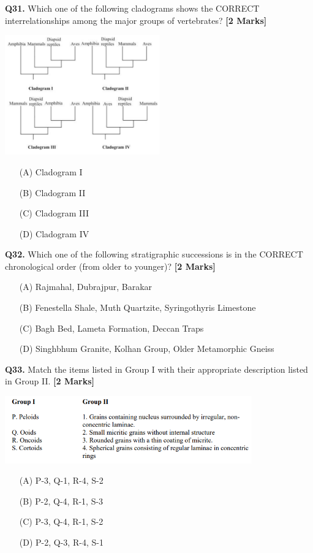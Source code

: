 \documentclass[11pt]{article}
\newcommand{\questionb}[2]{
    \noindent\textbf{Q#2.} #1 \hfill \textbf{[2 Marks]}
}
\begin{document}
\questionb{Which one of the following cladograms shows the CORRECT interrelationships among the major groups of vertebrates?}{31}
\begin{center}
\includegraphics[width=0.5\textwidth]{figures/31}
\end{center}
\begin{enumerate}
    \item[(A)] Cladogram I
    \item[(B)] Cladogram II
    \item[(C)] Cladogram III
    \item[(D)] Cladogram IV
\end{enumerate}
\vspace{0.5cm}

\questionb{Which one of the following stratigraphic successions is in the CORRECT chronological order (from older to younger)?}{32}
\begin{enumerate}
    \item[(A)] Rajmahal, Dubrajpur, Barakar
    \item[(B)] Fenestella Shale, Muth Quartzite, Syringothyris Limestone
    \item[(C)] Bagh Bed, Lameta Formation, Deccan Traps
    \item[(D)] Singhbhum Granite, Kolhan Group, Older Metamorphic Gneiss
\end{enumerate}
\vspace{0.5cm}

\questionb{Match the items listed in Group I with their appropriate description listed in Group II.}{33}
\begin{center}
\includegraphics[width=0.8\textwidth]{figures/33.png}
\end{center}
\begin{enumerate}
    \item[(A)] P-3, Q-1, R-4, S-2
    \item[(B)] P-2, Q-4, R-1, S-3
    \item[(C)] P-3, Q-4, R-1, S-2
    \item[(D)] P-2, Q-3, R-4, S-1
\end{enumerate}
\vspace{0.5cm}
\end{document}
